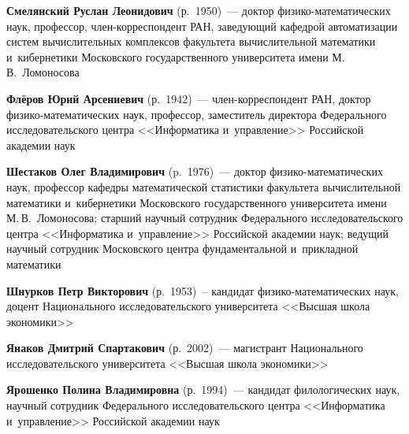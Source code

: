 \begin{multicols}{2}
\noindent
\textbf{Смелянский Руслан Леонидович} (р.\ 1950)~--- доктор фи\-зи\-ко-ма\-те\-ма\-ти\-че\-ских наук, профессор, член-кор\-рес\-пон\-дент РАН, 
за\-ве\-ду\-ющий ка\-фед\-рой автоматизации сис\-тем вычислительных комплексов факуль\-те\-та вы\-чис\-ли\-тель\-ной математики и~кибернетики Московского 
государственного университета имени М.\,В.~Ломоносова

\noindent
\textbf{Флёров Юрий Арсениевич} (р.\ 1942)~--- член-кор\-рес\-пон\-дент РАН, доктор фи\-зи\-ко-ма\-те\-ма\-ти\-че\-ских наук, 
профессор, заместитель директора Федерального исследовательского цент\-ра <<Информатика и~управ\-ле\-ние>> Российской академии наук

\noindent
\textbf{Шестаков Олег Владимирович} (p.\ 1976)~--- доктор фи\-зи\-ко-ма\-те\-ма\-ти\-че\-ских наук, 
профессор ка\-фед\-ры математической ста\-ти\-сти\-ки факультета вы\-чис\-ли\-тель\-ной математики 
и~кибернетики Московского государственного университета имени М.\,В.~Ломоносова; 
старший научный сотрудник Федерального исследовательского цент\-ра <<Информатика и~управ\-ле\-ние>>
Российской академии наук; ведущий научный сотрудник Московского центра фундаментальной и~прикладной математики

\vspace*{2.8pt}

\noindent
\textbf{Шнурков Петр Викторович} (р.\ 1953)~-- кандидат фи\-зи\-ко-ма\-те\-ма\-ти\-че\-ских наук, 
доцент Национального исследовательского университета <<Высшая школа экономики>>

\vspace*{2.8pt}

\noindent
\textbf{Янаков Дмитрий Спартакович} (р.\ 2002)~--- магистрант Национального исследовательского университета <<Высшая школа экономики>>

\vspace*{2.8pt}

\noindent
\textbf{Ярошенко Полина Владимировна} (р.\ 1994)~--- 
кандидат филологических наук, научный сотрудник Федерального исследовательского цент\-ра <<Информатика и~управ\-ле\-ние>> Российской академии наук





\def\leftkol{ОБ АВТОРАХ}

\def\rightkol{ОБ АВТОРАХ}


 \label{end\stat}



\end{multicols}

\def\leftkol{ОБ АВТОРАХ}
\def\rightkol{ОБ АВТОРАХ}

\newpage